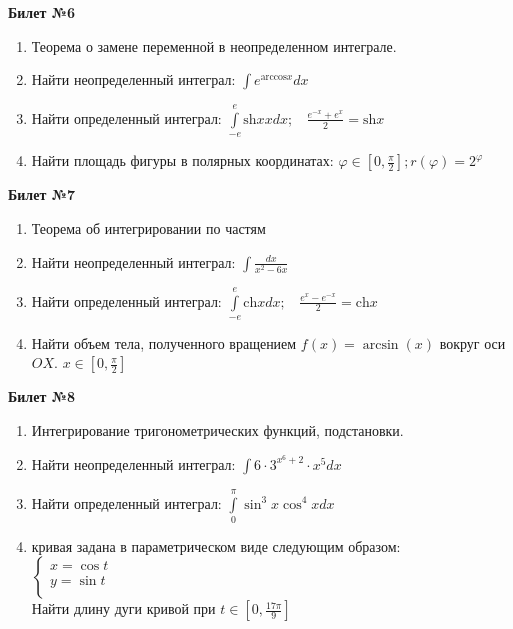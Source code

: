 \documentclass[a4paper, 12pt]{article}
\begin{document}
\begin{center}
	\textbf{Билет №6}
\end{center}
\begin{enumerate}
	\item Теорема о замене переменной в неопределенном интеграле.
	\item Найти неопределенный интеграл: $\displaystyle \int{e^{\text{arccos}x} dx}$
	\item Найти определенный интеграл: $\displaystyle \int\limits_{-e}^{e}{\text{sh}{x}{x} dx};\ \ \ \  \frac{e^{-x}+e^x}{2} = \text{sh}{x}$
	\item Найти площадь фигуры в полярных координатах: $\displaystyle \varphi \in \left[0, \frac{\pi}{2}\right]; r(\varphi) = 2^\varphi$
\end{enumerate}

\begin{center}
	\textbf{Билет №7}
\end{center}
\begin{enumerate}
	\item Теорема об интегрировании по частям 
	\item Найти неопределенный интеграл: $\displaystyle \int{\frac{dx}{x^2 - 6x}}$
	\item Найти определенный интеграл: $\displaystyle \int\limits_{-e}^{e}{\text{ch}{x}dx}; \ \ \ \ \frac{e^{x} - e^{-x}}{2} = \text{ch}{x}$
	\item Найти объем тела, полученного вращением $\displaystyle f(x) = \arcsin(x)$ вокруг оси $OX$. $\displaystyle x \in \left[0, \frac{\pi}{2}\right]$
\end{enumerate}

\begin{center}
	\textbf{Билет №8}
\end{center}
\begin{enumerate}
	\item Интегрирование тригонометрических функций, подстановки.
	\item Найти неопределенный интеграл: $\displaystyle \int{6 \cdot 3^{x^6 + 2} \cdot x^5 dx}$
	\item Найти определенный интеграл: $\displaystyle \int\limits_{0}^{\pi}{\sin^3{x}\cos^4{x}dx}$
	\item кривая задана в параметрическом виде следующим образом: \\
	$
	\begin{cases}
		x = \cos{t} \\
		y=\sin{t} \\
	\end{cases}
	$
	\\
	Найти длину дуги кривой при $\displaystyle t \in \left[0, \frac{17\pi}{9}\right]$
\end{enumerate}
\end{document}
